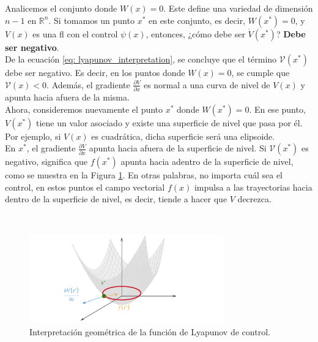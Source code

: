 Analicemos el conjunto donde \( W(x) = 0 \). Este define una variedad de dimensión \( n-1 \) en \( \mathbb{R}^n \). Si tomamos un punto \( x^* \) en este conjunto, es decir, \( W(x^*) = 0 \), y \( V(x) \) es una \gls{fl} con el control \( \psi(x) \), entonces, ¿cómo debe ser \( \dot{V}(x^*) \)?  \textbf{Debe ser negativo}.\\

De la ecuación \eqref{eq: lyapunov_interpretation}, se concluye que el término \( \mathcal{V}(x^*) \) debe ser negativo. Es decir, en los puntos donde \( W(x) = 0 \), se cumple que \( \mathcal{V}(x) < 0 \). Además, el gradiente \( \frac{\partial V}{\partial x} \) es normal a una curva de nivel de \( V(x) \) y apunta hacia afuera de la misma. \\

Ahora, consideremos nuevamente el punto \( x^* \) donde \( W(x^*) = 0 \). En ese punto, \( V(x^*) \) tiene un valor asociado y existe una superficie de nivel que pasa por él. Por ejemplo, si \( V(x) \) es cuadrática, dicha superficie será una elipsoide. \\

En \( x^* \), el gradiente \( \frac{\partial V}{\partial x} \) apunta hacia afuera de la superficie de nivel. Si \( \mathcal{V}(x^*) \) es negativo, significa que \( f(x^*) \) apunta hacia adentro de la superficie de nivel, como se muestra en la Figura \ref{fig: lyapunov_interpretation}. En otras palabras, no importa cuál sea el control, en estos puntos el campo vectorial $f(x)$ impulsa a las trayectorias hacia dentro de la superficie de nivel, es decir, tiende a hacer que $V$ decrezca.

\\

\begin{figure}[H]
	\centering
	\includegraphics[width=0.75\textwidth]{img/flc_lyap_geom_interp.pdf}
	\caption{Interpretación geométrica de la función de Lyapunov de control.}
	\label{fig: lyapunov_interpretation}
\end{figure}


